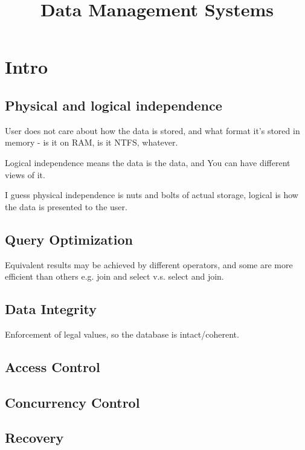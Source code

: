 \documentclass{article}
\begin{document}
\title{Data Management Systems}
\author{}
\date{}

\maketitle

\section{Intro}

	\subsection{Physical and logical independence}
		
		User does not care about how the data is stored, and what format it's stored in memory - is it on RAM, is it NTFS, whatever.
		
		Logical independence means the data is the data, and You can have different views of it. 
		
		I guess physical independence is nuts and bolts of actual storage, logical is how the data is presented to the user.
	
	\subsection{Query Optimization}
	
		Equivalent results may be achieved by different operators, and some are more efficient than others e.g. join and select v.s. select and join.		
		
	\subsection{Data Integrity}
	
		Enforcement of legal values, so the database is intact/coherent.
	
	\subsection{Access Control}
	
	\subsection{Concurrency Control}
	
	\subsection{Recovery}
	
\end{document}
